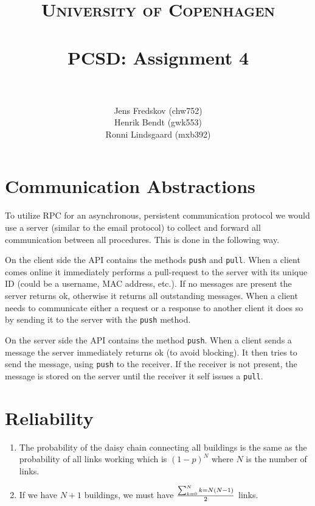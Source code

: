 \documentclass[a4paper, 11pt]{article}
\title{ 
\normalfont \normalsize 
\textsc{University of Copenhagen} \\ [25pt]
\horrule{0.5pt} \\[0.4cm]
\huge PCSD: Assignment 4 \\
\horrule{2pt} \\[0.5cm]
}
\author{Jens Fredskov (chw752)\\Henrik Bendt (gwk553)\\Ronni Lindsgaard (mxb392)} %
\begin{document}
\maketitle
\pagebreak

\section{Communication Abstractions} %
\label{sec:communication_abstractions}

To utilize RPC for an asynchronous, persistent communication protocol we would use a server (similar to the email protocol) to collect and forward all communication between all procedures. This is done in the following way.

On the client side the API contains the methods \texttt{push} and \texttt{pull}. When a client comes online it immediately performs a pull-request to the server with its unique ID (could be a username, MAC address, etc.). If no messages are present the server returns ok, otherwise it returns all outstanding messages. When a client needs to communicate either a request or a response to another client it does so by sending it to the server with the \texttt{push} method.

On the server side the API contains the method \texttt{push}. When a client sends a message the server immediately returns ok (to avoid blocking). It then tries to send the message, using \texttt{push} to the receiver. If the receiver is not present, the message is stored on the server until the receiver it self issues a \texttt{pull}.



\section{Reliability} %
\label{sec:reliability}

\begin{enumerate}
    \item The probability of the daisy chain connecting all buildings is the same as the probability of all links working which is $(1-p)^N$ where $N$ is the number of links.
    \item If we have $N+1$ buildings, we must have $\sum_{k=0}^N k = N(N-1) \over 2$ links. 
\end{enumerate}

\end{document}
